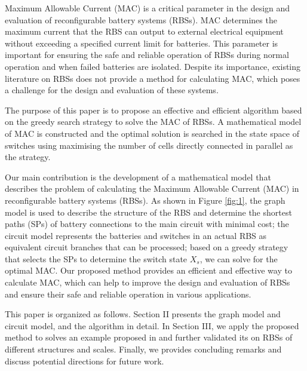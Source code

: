 \documentclass{article}
\begin{document}
Maximum Allowable Current (MAC) is a critical parameter in the design and evaluation of reconfigurable battery systems (RBSs). 
MAC determines the maximum current that the RBS can output to external electrical equipment without exceeding a specified current limit for batteries.
This parameter is important for ensuring the safe and reliable operation of RBSs during normal operation and when failed batteries are isolated. 
Despite its importance, existing literature on RBSs does not provide a method for calculating MAC, which poses a challenge for the design and evaluation of these systems.


The purpose of this paper is to propose an effective and efficient algorithm based on the greedy search strategy to solve the MAC of RBSs. 
A mathematical model of MAC is constructed and the optimal solution is searched in the state space of switches using maximising the number of cells directly connected in parallel as the strategy.

Our main contribution is the development of a mathematical model that describes the problem of calculating the Maximum Allowable Current (MAC) in reconfigurable battery systems (RBSs). 
As shown in Figure \ref{fig:1}, the graph model is used to describe the structure of the RBS and determine the shortest paths (SPs) of battery connections to the main circuit with minimal cost;
the circuit model represents the batteries and switches in an actual RBS as equivalent circuit branches that can be processed;
based on a greedy strategy that selects the SPs to determine the switch state $X_s$, we can solve for the optimal MAC. 
Our proposed method provides an efficient and effective way to calculate MAC, which can help to improve the design and evaluation of RBSs and ensure their safe and reliable operation in various applications.


This paper is organized as follows. 
Section II presents the graph model and circuit model, and the algorithm in detail.
In Section III, we apply the proposed method to solves an example proposed in \cite{kimDESADependableEfficient2012} and further validated its on RBSs of different structures and scales.
Finally, we provides concluding remarks and discuss potential directions for future work.
\end{document}
